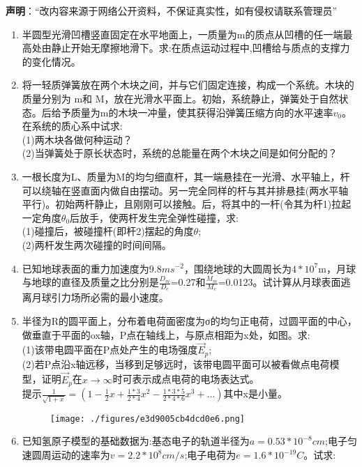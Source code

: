 
\textbf{声明}：“改内容来源于网络公开资料，不保证真实性，如有侵权请联系管理员”

\begin{enumerate}
\item 半圆型光滑凹槽竖直固定在水平地面上，一质量为m的质点从凹槽的任一端最高处由静止开始无摩擦地滑下。求:在质点运动过程中,凹槽给与质点的支撑力的变化情况。
\item 将一轻质弹簧放在两个木块之间，并与它们固定连接，构成一个系统。木块的质量分别为 m和 M，放在光滑水平面上。初始，系统静止，弹簧处于自然状态。后给予质量为m的木块一冲量，使其获得沿弹簧压缩方向的水平速率$v_0$。在系统的质心系中试求:\\
(1)两木块各做何种运动？\\
(2)当弹簧处于原长状态时，系统的总能量在两个木块之间是如何分配的？
\item 一根长度为L、质量为M的均匀细直杆，其一端悬挂在一光滑、水平轴上，杆可以绕轴在竖直面内做自由摆动。另一完全同样的杆与其并排悬挂(两水平轴平行)。初始两杆静止，且刚刚可以接触。后，将其中的一杆(令其为杆1)拉起一定角度$\theta_0$后放手，使两杆发生完全弹性碰撞，求:\\
(1)碰撞后，被碰撞杆(即杆2)摆起的角度$\theta$;\\
(2)两杆发生两次碰撞的时间间隔。
\item 已知地球表面的重力加速度为$9.8ms^{-2}$，围绕地球的大圆周长为$4*10^7$m，月球与地球的直径及质量之比分别是$\frac{D_m}{D_e}$=0.27和$\frac{M_m}{M_e}$=0.0123。试计算从月球表面逃离月球引力场所必需的最小速度。
\item 半径为R的圆平面上，分布着电荷面密度为σ的均匀正电荷，过圆平面的中心，做垂直于平面的ox轴，P点在轴线上，与原点相距为x处，如图。求:\\
(1)该带电圆平面在P点处产生的电场强度$\vec E_p$;\\
(2)若P点沿x轴远移，当移到足够远时，该带电圆平面可以被看做点电荷模型，证明$\vec E_p$在$x \to \infty$时可表示成点电荷的电场表达式。\\
提示$\displaystyle \frac{1}{\sqrt{1+x}}=(1-\frac{1}{2}x+\frac{1*3}{2*4}x^2-\frac{1*3*5}{2*4*6}x^3+\dots)$其中x是小量。
\begin{figure}[ht]
\centering
\texttt{[image: ./figures/e3d9005cb4dcd0e6.png]}
\caption{} \label{fig_SSD10_1}
\end{figure}
\item 已知氢原子模型的基础数据为:基态电子的轨道半径为$a=0.53*10^{-8}cm$;电子匀速圆周运动的速率为$v=2.2*10^8cm/s$;电子电荷为$e=1.6*10^{-19}C$。试求:\\

\end{enumerate}
